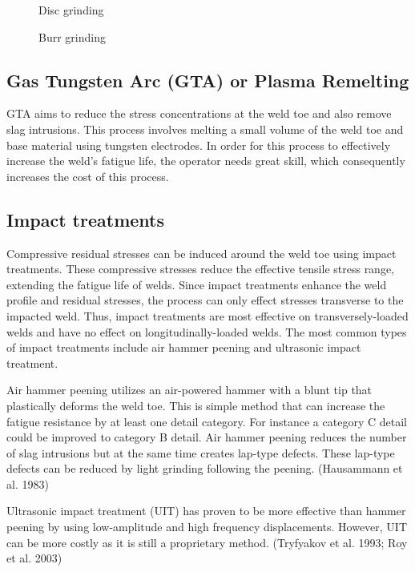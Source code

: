 \begin{figure}
  \caption{Disc grinding}
  \label{fig:disc-grinding}
\end{figure}

\begin{figure}
  \caption{Burr grinding}
  \label{fig:burr-grinding}
\end{figure}

\subsection{Gas Tungsten Arc (GTA) or Plasma Remelting}

GTA aims to reduce the stress concentrations at the weld toe and also remove slag intrusions. This process
involves melting a small volume of the weld toe and base material using tungsten electrodes. In order for this
process to effectively increase the weld’s fatigue life, the operator needs great skill, which consequently increases the
cost of this process.


\subsection{Impact treatments}

Compressive residual stresses can be induced around the weld toe using impact treatments. These compressive
stresses reduce the effective tensile stress range, extending the fatigue life of welds. Since impact treatments enhance
the weld profile and residual stresses, the process can only effect stresses transverse to the impacted weld. Thus,
impact treatments are most effective on transversely-loaded welds and have no effect on longitudinally-loaded welds.
The most common types of impact treatments include air hammer peening and ultrasonic impact treatment.

Air hammer peening utilizes an air-powered hammer with a blunt tip that plastically deforms the weld toe. This
is simple method that can increase the fatigue resistance by at least one detail category. For instance a category C detail could be improved to category B detail. Air hammer peening reduces the number of slag intrusions but at the
same time creates lap-type defects. These lap-type defects can be reduced by light grinding following the peening.
(Hausammann et al. 1983)

Ultrasonic impact treatment (UIT) has proven to be more effective than hammer peening by using low-amplitude
and high frequency displacements. However, UIT can be more costly as it is still a proprietary method. (Tryfyakov
et al. 1993; Roy et al. 2003)

